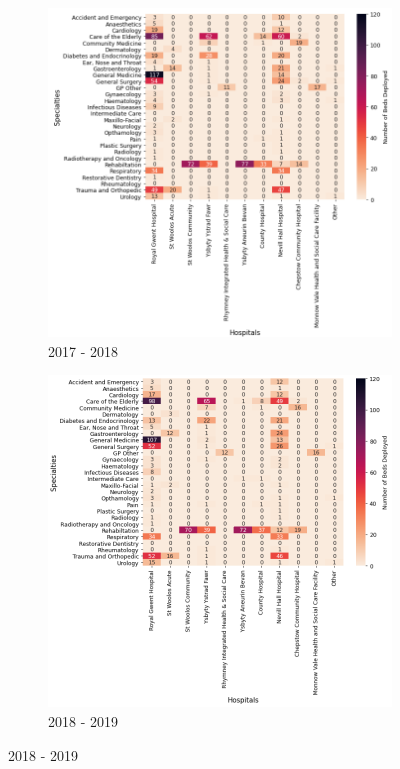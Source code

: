 \documentclass[../thesis.tex]{subfiles}
\begin{document}
\begin{figure}
     \centering
     \begin{subfigure}[h!]{0.8\textwidth}
         \centering
         \includegraphics[width=\textwidth]{Chapters/Chapter5/Figures/python2017stoch.png}
         \caption{2017 - 2018}
         \label{fig:stocexppy2a}
     \end{subfigure}
\hfill
     \begin{subfigure}{0.8\textwidth}\ContinuedFloat
         \centering
         \includegraphics[width=\textwidth]{Chapters/Chapter5/Figures/python2018stoch.png}
         \caption{2018 - 2019}
         \label{fig:stocexppy2b}
     \end{subfigure}
     \end{figure}
\end{document}
